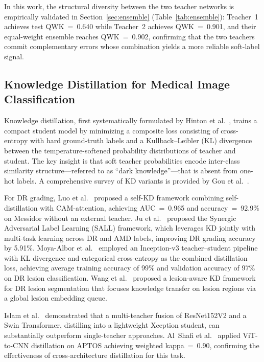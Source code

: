 \documentclass[a4paper,fleqn]{cas-dc}
\begin{document}
In this work, the structural diversity between the two teacher networks is empirically validated in Section~\ref{sec:ensemble} (Table~\ref{tab:ensemble}): Teacher~1 achieves test QWK~=~0.640 while Teacher~2 achieves QWK~=~0.901, and their equal-weight ensemble reaches QWK~=~0.902, confirming that the two teachers commit complementary errors whose combination yields a more reliable soft-label signal.

\subsection{Knowledge Distillation for Medical Image Classification}

Knowledge distillation, first systematically formulated by Hinton et al.\ \cite{hinton2015}, trains a compact student model by minimizing a composite loss consisting of cross-entropy with hard ground-truth labels and a Kullback--Leibler (KL) divergence between the temperature-softened probability distributions of teacher and student. The key insight is that soft teacher probabilities encode inter-class similarity structure---referred to as ``dark knowledge''---that is absent from one-hot labels. A comprehensive survey of KD variants is provided by Gou et al.\ \cite{gou2021}.

For DR grading, Luo et al.\ \cite{luo2020} proposed a self-KD framework combining self-distillation with CAM-attention, achieving AUC~=~0.965 and accuracy~=~92.9\% on Messidor without an external teacher. Ju et al.\ \cite{ju2021} proposed the Synergic Adversarial Label Learning (SALL) framework, which leverages KD jointly with multi-task learning across DR and AMD labels, improving DR grading accuracy by 5.91\%. Moya-Albor et al.\ \cite{moya2024} employed an Inception-v3 teacher--student pipeline with KL divergence and categorical cross-entropy as the combined distillation loss, achieving average training accuracy of 99\% and validation accuracy of 97\% on DR lesion classification. Wang et al.\ \cite{wang2024} proposed a lesion-aware KD framework for DR lesion segmentation that focuses knowledge transfer on lesion regions via a global lesion embedding queue.

Islam et al.\ \cite{islam2023} demonstrated that a multi-teacher fusion of ResNet152V2 and a Swin Transformer, distilling into a lightweight Xception student, can substantially outperform single-teacher approaches. Al~Shafi et al.\ \cite{alshafi2024} applied ViT-to-CNN distillation on APTOS achieving weighted kappa~=~0.90, confirming the effectiveness of cross-architecture distillation for this task.
\end{document}
